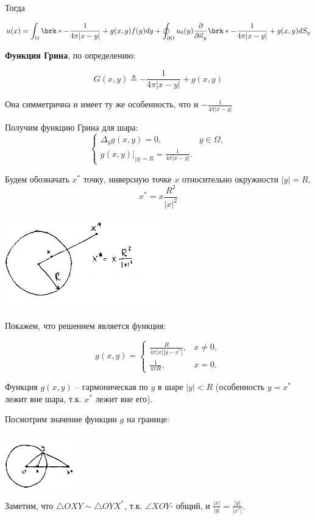 Тогда

$$u(x) = \int_{\Omega} {\brk*{-\frac{1}{4 \pi |x-y|} +g(x,y)} f(y) dy} + \oint_{\partial \Omega} {u_0(y) \frac{\partial}{\partial \vec{n}_y} \brk*{-\frac{1}{4 \pi |x-y|}+g(x,y)}dS_y}
$$

\textbf{Функция Грина}, по определению:

$$G(x,y) \triangleq  -\frac{1}{4 \pi |x-y|} + g(x,y) $$

Она симметрична и имеет ту же особенность, что и $-\frac{1}{4 \pi |x-y|}$







Получим функцию Грина для шара:
\[\begin{cases}
   \Delta_y g(x,y) = 0,  & y \in \Omega, \\
   g(x,y)|_{|y|=R} = \frac{1}{4 \pi |x-y|}.
\end{cases}\]  

Будем обозначать $x^*$ точку, инверсную точке $x$ относительно окружности $|y|=R$.
$$x^* = x \frac{R^2}{|x|^2}$$
\begin{center}
\includegraphics{24_1_new}
\end{center}
Покажем, что решением является функция:

\[g(x,y) = \begin{cases}
   \frac{R}{4 \pi |x| |y-x^*|}, & x \ne 0, \\
   \frac{1}{4 \pi R}, & x=0.
\end{cases}\]

Функция $g(x,y)$ -- гармоническая по $y$ в шаре $|y|<R$ (особенность $y=x^*$ лежит вне шара, т.к. $x^*$ лежит вне его).

Посмотрим значение функции $g$ на границе:
\begin{center}
\includegraphics{24_2_new}
\end{center}
Заметим, что $\triangle OXY \sim \triangle OYX^*$, т.к. $\angle XOY$- общий, и $\frac{|x|}{|y|}  =\frac{|y|}{|x^*|}$.

